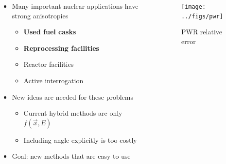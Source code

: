 \documentclass[xcolor=x11names,compress]{beamer}
\renewcommand{\(}{\begin{columns}}
\renewcommand{\)}{\end{columns}}
\newcommand{\<}[1]{\begin{column}{#1}}
\renewcommand{\>}{\end{column}}
\begin{document}
\begin{frame}[fragile]
	\begin{columns}
  	\begin{column}{0.5\textwidth}
	\begin{itemize}
	\item Many important nuclear applications have strong anisotropies
	 \begin{itemize}
	 \item \textbf{Used fuel casks}
	 \item \textbf{Reprocessing facilities}
	 \item Reactor facilities
	 \item Active interrogation 
	 \end{itemize}
	\pause
	\item New ideas are needed for these problems
	\begin{itemize}
	\item Current hybrid methods are only $f(\vec{x}, E)$
	\item Including angle explicitly is too costly	
	\end{itemize}
	\pause
	\item \alert{Goal}: new methods that are easy to use
	\end{itemize}
  	\end{column}
 	\begin{column}{0.5\textwidth}
 	 \begin{center}
 	 \begin{figure}
 	 \texttt{[image: ../figs/pwr]}  
 	 \caption{PWR relative error \cite{Pantelias2013}}
 	 \end{figure}
 	 \end{center}

  	\end{column}
	\end{columns}

\end{frame}
\end{document}
